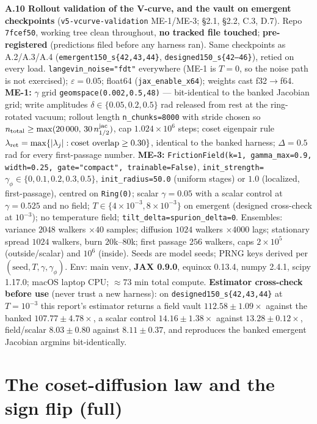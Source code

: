 \documentclass{article}
\begin{document}
\textbf{A.10 Rollout validation of the V-curve, and the vault on emergent checkpoints} (\texttt{v5-vcurve-validation} ME-1/ME-3; \S 2.1, \S 2.2, C.3, D.7). Repo \texttt{7fcef50}, working tree clean throughout, \textbf{no tracked file touched}; \textbf{pre-registered} (predictions filed before any harness ran). Same checkpoints as A.2/A.3/A.4 (\texttt{emergent150\_s\{42,43,44\}}, \texttt{designed150\_s\{42--46\}}), retied on every load. \texttt{langevin\_noise="fdt"} everywhere (ME-1 is $T=0$, so the noise path is not exercised); $\varepsilon=0.05$; float64 (\texttt{jax\_enable\_x64}); weights cast f32$\to$f64. \textbf{ME-1:} $\gamma$ grid \texttt{geomspace(0.002,0.5,48)} --- bit-identical to the banked Jacobian grid; write amplitudes $\delta\in\{0.05,0.2,0.5\}$ rad released from rest at the ring-rotated vacuum; rollout length \texttt{n\_chunks=8000} with stride chosen so $n_{\rm total}\ge\max(20\,000,\,30\,n_{1/2}^{\rm jac})$, cap $1.024\times10^6$ steps; coset eigenpair rule $\lambda_{\rm ret}=\max\{|\lambda_j|:\text{coset overlap}\ge0.30\}$, identical to the banked harness; $\Delta=0.5$ rad for every first-passage number. \textbf{ME-3:} \texttt{FrictionField(k=1, gamma\_max=0.9, width=0.25, gate="compact", trainable=False)}, \texttt{init\_strength=}$\gamma_\phi\in\{0,0.1,0.2,0.3,0.5\}$, \texttt{init\_radius=50.0} (uniform stages) or $1.0$ (localized, first-passage), centred on \texttt{Ring(0)}; scalar $\gamma=0.05$ with a scalar control at $\gamma=0.525$ and no field; $T\in\{4\times10^{-3},8\times10^{-3}\}$ on emergent (designed cross-check at $10^{-3}$); no temperature field; \texttt{tilt\_delta=spurion\_delta=0}. Ensembles: variance $2048$ walkers $\times40$ samples; diffusion $1024$ walkers $\times4000$ lags; stationary spread $1024$ walkers, burn $20$k--$80$k; first passage $256$ walkers, caps $2\times10^5$ (outside/scalar) and $10^6$ (inside). Seeds are model seeds; PRNG keys derived per $(\text{seed},T,\gamma,\gamma_\phi)$. Env: main venv, \textbf{JAX 0.9.0}, equinox 0.13.4, numpy 2.4.1, scipy 1.17.0; macOS laptop CPU; $\approx73$ min total compute. \textbf{Estimator cross-check before use} (never trust a new harness): on \texttt{designed150\_s\{42,43,44\}} at $T=10^{-3}$ this report's estimator returns a field vault $112.58\pm1.09\times$ against the banked $107.77\pm4.78\times$, a scalar control $14.16\pm1.38\times$ against $13.28\pm0.12\times$, field/scalar $8.03\pm0.80$ against $8.11\pm0.37$, and reproduces the banked emergent Jacobian argmins bit-identically.

\section{The coset-diffusion law and the sign flip (full)}
\end{document}
